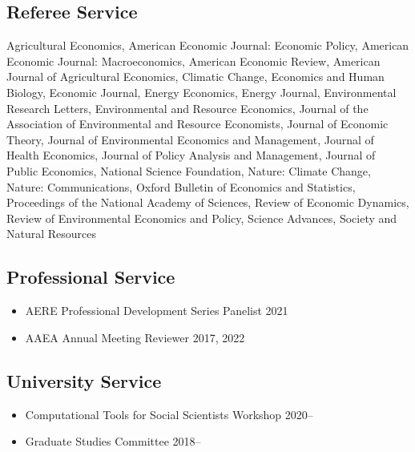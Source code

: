 \documentclass[11pt]{res} %
\begin{document}
\begin{resume}
\vspace{-.2in}

\subsection{Referee Service}\vspace{-.2in}
	Agricultural Economics,
	American Economic Journal: Economic Policy,
	American Economic Journal: Macroeconomics,
	American Economic Review,
	American Journal of Agricultural Economics,
	Climatic Change,
	Economics and Human Biology,
	Economic Journal,
	Energy Economics,
	Energy Journal,
	Environmental Research Letters,
	Environmental and Resource Economics,
	Journal of the Association of Environmental and Resource Economists,
	Journal of Economic Theory,
	Journal of Environmental Economics and Management,
	Journal of Health Economics,
	Journal of Policy Analysis and Management,
	Journal of Public Economics,
	National Science Foundation,
	Nature: Climate Change,
	Nature: Communications,
	Oxford Bulletin of Economics and Statistics,
	Proceedings of the National Academy of Sciences,
	Review of Economic Dynamics,
	Review of Environmental Economics and Policy,
	Science Advances,
	Society and Natural Resources

\vspace{-.2in}

\subsection{Professional Service}
\begin{itemize} \itemsep -1pt
	\item[]	AERE Professional Development Series Panelist \hfill 2021
	\item[] AAEA Annual Meeting Reviewer \hfill 2017, 2022
\end{itemize}


\vspace{-.2in}

\subsection{University Service}
\begin{itemize} \itemsep -1pt
	\item[] Computational Tools for Social Scientists Workshop \hfill 2020--
	\item[]	Graduate Studies Committee \hfill 2018--
\end{itemize}


\end{resume}
\end{document}
